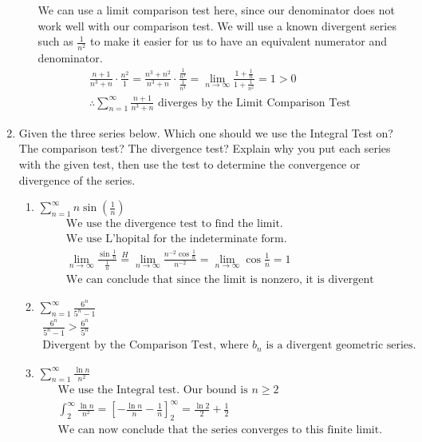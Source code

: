 \documentclass[12pt]{article}
\begin{document}
\begin{enumerate}
\begin{enumerate}
            \\\\We can use a limit comparison test here, since our denominator does not work well with our comparison test. We will use a known divergent series such as $\frac{1}{n^2}$ to make it easier for us to have an equivalent numerator and denominator.
            \begin{gather*}
            \frac{n+1}{n^3+n} \cdot\frac{n^2}{1}=\frac{n^3+n^2}{n^3+n}\cdot\frac{\frac{1}{n^3}}{\frac{1}{n^3}}=\lim_{n\to\infty}\frac{1+\frac{1}{n}}{1+\frac{1}{n^2}}=1 > 0 
            \\\text{$\therefore \sum^\infty_{n=1}\frac{n+1}{n^3+n}$ diverges by the Limit Comparison Test}
            \end{gather*}
    \end{enumerate}
    \item Given the three series below. Which one should we use the Integral Test on? The comparison test? The divergence test? Explain why you put each series with the given test, then use the test to determine the convergence or divergence of the series.
    \begin{enumerate}
        \item $\sum^\infty_{n=1}n\sin(\frac{1}{n})$
        \begin{gather*}
            \text{We use the divergence test to find the limit.}
            \\\text{We use L'hopital for the indeterminate form.}
            \\\lim_{n\to\infty}\frac{\sin{\frac{1}{n}}}{\frac{1}{n}}\stackrel{H}{=}\lim_{n\to\infty}\frac{n^{-2}\cos{\frac{1}{n}}}{n^{-2}}=\lim_{n\to\infty}\cos{\frac{1}{n}}=1
            \\\text{We can conclude that since the limit is nonzero, it is divergent}
        \end{gather*}
        \item $\sum^\infty_{n=1}\frac{6^n}{5^n-1}$ 
        \begin{gather*}
            \frac{6^n}{5^n-1}>\frac{6^n}{5^n}
            \\\text{Divergent by the Comparison Test, where $b_n$ is a divergent geometric series.}
        \end{gather*}
        \item $\sum^\infty_{n=1}\frac{\ln n}{n^2}$
        \begin{gather*}
            \text{We use the Integral test. Our bound is $n\geq2$}
            \\\int_2^\infty\frac{\ln n}{n^2}=\left[-\frac{\ln n}{n}-\frac{1}{n}\right]^\infty_2=\frac{\ln 2}{2}+\frac{1}{2}
            \\\text{We can now conclude that the series converges to this finite limit.}
        \end{gather*}
        
    \end{enumerate}
\end{enumerate}
\end{document}
